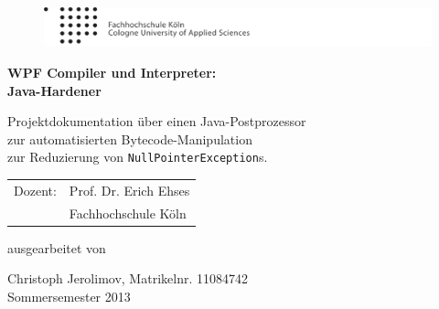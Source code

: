
\begin{titlepage}

\begin{center}

\begin{figure}[!ht]
	\centering
		\includegraphics[natwidth=920pt, natheight=95pt, width=1.0\textwidth]{tex/logoheader.pdf}
\end{figure}

\vspace{5.0cm}

\begin{Huge}
	\textbf{WPF Compiler und Interpreter:}\\
	\vspace{0.1cm}
	\textbf{Java-Hardener}\\
\end{Huge}

\vspace{0.8cm}

\begin{LARGE}
	Projektdokumentation über einen Java-Postprozessor\\
	\vspace{0.1cm}
	zur automatisierten Bytecode-Manipulation\\
	\vspace{0.1cm}
	zur Reduzierung von \texttt{NullPointerException}s.\\
\end{LARGE}

\vspace{2.5cm}

\begin{tabular}{rl}
        Dozent:  &  Prof. Dr. Erich Ehses\\
       			 &  \small Fachhochschule Köln \\[1.0em]
\end{tabular}

\vspace{2.0cm}

\begin{large}
	ausgearbeitet von\\
	\vspace{0.2cm}
\end{large}

\begin{Large}
	Christoph Jerolimov, Matrikelnr. 11084742\\
	\vspace{0.5cm}
	Sommersemester 2013
\end{Large}

\end{center}

\end{titlepage}
